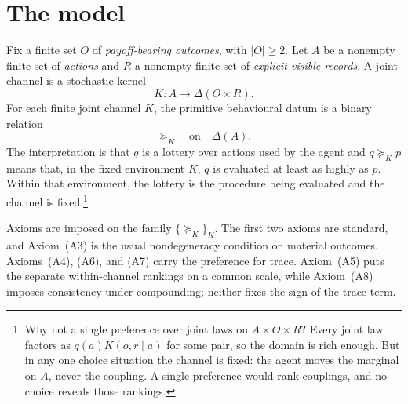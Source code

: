 \documentclass[11pt,a4paper]{article}
\theoremstyle{definition}
\newcommand{\D}{\Delta}
\newcommand{\1}{\mathbf 1}
\begin{document}
\section{The model}\label{sec:model}

Fix a finite set $O$ of \emph{payoff-bearing outcomes}, with $|O|\ge2$.  Let $A$ be a nonempty finite set of
\emph{actions} and $R$ a nonempty finite set of \emph{explicit visible records}.  A joint channel is a stochastic
kernel
\[
  K:A\longrightarrow\D(O\times R).
\]
For each finite joint channel $K$, the primitive behavioural datum is a binary relation
\[
 \succeq_K\quad\text{on}\quad\D(A).
\]
The interpretation is that $q$ is a lottery over actions used by the agent and $q\succeq_Kp$ means that, in the fixed
environment $K$, $q$ is evaluated at least as highly as $p$.  Within that environment, the lottery is the
procedure being evaluated and the channel is fixed.\footnote{Why not a single
preference over joint laws on $A\times O\times R$?  Every joint law factors as $q(a)K(o,r\mid a)$ for some pair,
so the domain is rich enough.  But in any one choice situation the channel is fixed: the agent moves the
marginal on $A$, never the coupling.  A single preference would rank couplings, and no choice reveals those
rankings.}

\bigskip
Axioms are imposed on the family $\{\succeq_K\}_K$.
The first two axioms are standard, and Axiom~\textup{(A3)} is the usual nondegeneracy condition on material
outcomes.  Axioms~\textup{(A4)}, \textup{(A6)}, and \textup{(A7)} carry the preference for trace.
Axiom~\textup{(A5)} puts the separate within-channel rankings on a common scale, while
Axiom~\textup{(A8)} imposes consistency under compounding; neither fixes the sign of the trace term.
\end{document}
